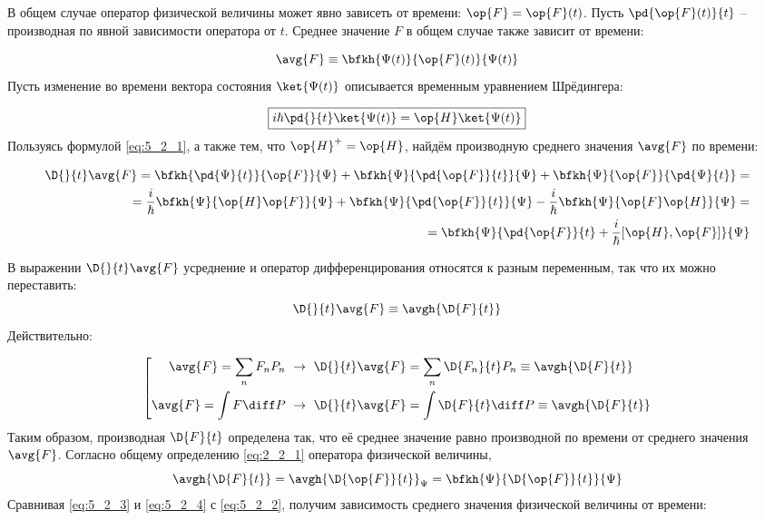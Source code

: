 В общем случае оператор физической величины может явно зависеть от времени: $\op{F}=\op{F}(t)$. Пусть $\pd{\op{F}(t)}{t}$ -- производная по явной зависимости оператора от $t$. Среднее значение $F$ в общем случае также зависит от времени:

$$
  \avg{F} \equiv \bfkh{\Psi(t)}{\op{F}(t)}{\Psi(t)}
$$%
%
Пусть изменение во времени вектора состояния $\ket{\Psi(t)}$ описывается временным уравнением Шрёдингера\footnotemark:


\begin{equation}
  \label{eq:5_2_1}
  \boxed{
    i\hbar\pd{}{t}\ket{\Psi(t)} = \op{H}\ket{\Psi(t)}
  }
\end{equation}%
%
Пользуясь формулой \eqref{eq:5_2_1}, а также тем, что $\op{H}^+=\op{H}$, найдём производную среднего значения $\avg{F}$ по времени:

\begin{equation}
  \begin{split}
    \label{eq:5_2_2}
    \D{}{t} \avg{F} = \bfkh{\pd{\Psi}{t}}{\op{F}}{\Psi} 
        + \bfkh{\Psi}{\pd{\op{F}}{t}}{\Psi} + \bfkh{\Psi}{\op{F}}{\pd{\Psi}{t}} = \\ =
    \frac{i}{\hbar}\bfkh{\Psi}{\op{H}\op{F}}{\Psi} + \bfkh{\Psi}{\pd{\op{F}}{t}}{\Psi} -
        \frac{i}{\hbar}\bfkh{\Psi}{\op{F}\op{H}}{\Psi} = \\ =
    \bfkh{\Psi}{\pd{\op{F}}{t}+\frac{i}{\hbar}[\op{H},\op{F}]}{\Psi}
  \end{split}
\end{equation}

В выражении $\D{}{t} \avg{F}$ усреднение и оператор дифференцирования относятся к разным переменным, так что их можно переставить:
\begin{equation}
  \label{eq:5_2_3}
  \D{}{t} \avg{F} \equiv \avgh{\D{F}{t}}
\end{equation}%
%
Действительно:

$$
\left[
\begin{gathered}
  \avg{F} = \sum_n F_n P_n ~\rightarrow~ \D{}{t}\avg{F} =
    \sum_n \D{F_n}{t} P_n \equiv \avgh{\D{F}{t}}\\
  \avg{F} = \int F\diff P ~\rightarrow~ \D{}{t}\avg{F} =
    \int \D{F}{t}\diff P \equiv \avgh{\D{F}{t}}\\
\end{gathered}
\right.
$$%
%
Таким образом, производная $\D{F}{t}$ определена так, что её среднее значение равно производной по времени от среднего значения $\avg{F}$. Согласно общему определению \eqref{eq:2_2_1} оператора физической величины,
\begin{equation}
  \label{eq:5_2_4}
  \avgh{\D{F}{t}} = \avgh{\D{\op{F}}{t}}_{\Psi} =
    \bfkh{\Psi}{\D{\op{F}}{t}}{\Psi}
\end{equation}%
%
Сравнивая \eqref{eq:5_2_3} и \eqref{eq:5_2_4} с \eqref{eq:5_2_2}, получим зависимость среднего значения физической величины от времени:

